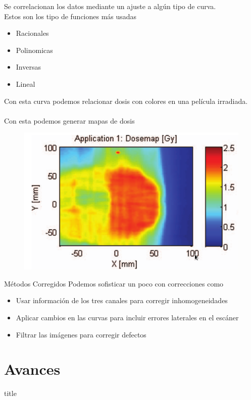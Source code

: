 \documentclass[12pt]{beamer}
\begin{document}
\begin{frame}
	Se correlacionan los datos mediante un ajuste a algún tipo de curva.\\
	Estos son los tipo de funciones más usadas
	\begin{itemize}
		\item Racionales 
		\item Polinomicas
		\item Inversas
		\item Lineal
	\end{itemize}
\end{frame}

\begin{frame}
	Con esta curva podemos relacionar dosis con colores en una película irradiada.\\~\\
	Con esta podemos generar mapas de dosis
	\begin{figure}
		\centering
		\includegraphics[width=0.7\linewidth]{images/dosemap.png}
	\end{figure}
\end{frame}


\begin{frame}{Métodos Corregidos}
Podemos sofisticar un poco con correcciones como 
\begin{itemize}
	\item Usar información de los tres canales para corregir inhomogeneidades
	\item Aplicar cambios en las curvas para incluir errores laterales en el escáner
	\item Filtrar las imágenes para corregir defectos
\end{itemize}
\end{frame}

\section{Avances}
\begin{frame}
	\vfill
	\centering
	\begin{beamercolorbox}[sep=8pt,center,shadow=true,rounded=true]{title}
		\insertsectionhead\par%
	\end{beamercolorbox}
	\vfill
\end{frame}
\end{document}
